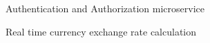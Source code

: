 
\begin{cvitems}
\vspace{5mm}
\item Authentication and Authorization microservice
\item Real time currency exchange rate calculation
\end{cvitems}
